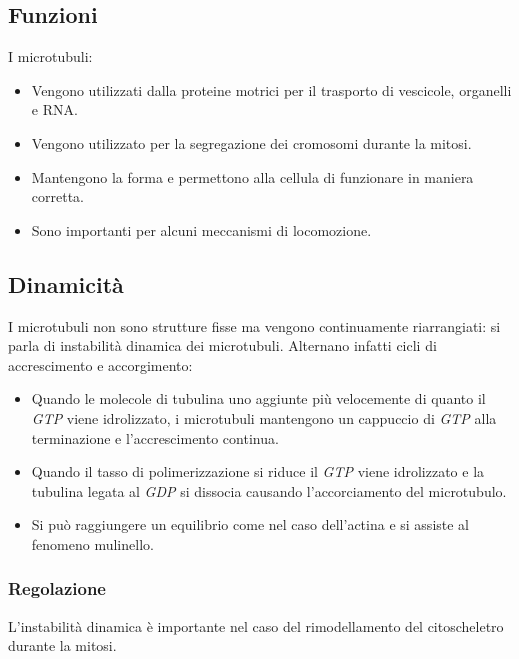 	\subsection{Funzioni}
	I microtubuli:
	\begin{multicols}{2}
		\begin{itemize}
			\item Vengono utilizzati dalla proteine motrici per il trasporto di vescicole, organelli e RNA.
			\item Vengono utilizzato per la segregazione dei cromosomi durante la mitosi.
			\item Mantengono la forma e permettono alla cellula di funzionare in maniera corretta.
			\item Sono importanti per alcuni meccanismi di locomozione.
		\end{itemize}
	\end{multicols}

	\subsection{Dinamicit\`a}
	I microtubuli non sono strutture fisse ma vengono continuamente riarrangiati: si parla di instabilit\`a dinamica dei microtubuli.
	Alternano infatti cicli di accrescimento e accorgimento:
	\begin{multicols}{2}
		\begin{itemize}
			\item Quando le molecole di tubulina uno aggiunte pi\`u velocemente di quanto il \emph{GTP} viene idrolizzato, i microtubuli mantengono un cappuccio di \emph{GTP} alla terminazione e l'accrescimento continua.
			\item Quando il tasso di polimerizzazione si riduce il \emph{GTP} viene idrolizzato e la tubulina legata al \emph{GDP} si dissocia causando l'accorciamento del microtubulo.
			\item Si pu\`o raggiungere un equilibrio come nel caso dell'actina e si assiste al fenomeno mulinello.
		\end{itemize}
	\end{multicols}

		\subsubsection{Regolazione}
		L'instabilit\`a dinamica \`e importante nel caso del rimodellamento del citoscheletro durante la mitosi.

